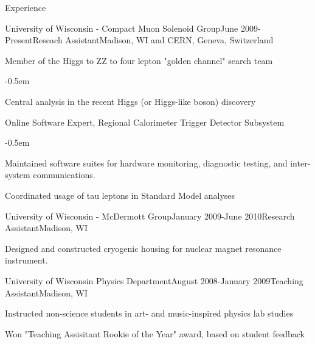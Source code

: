 \documentclass{resume} %
\begin{document}
\begin{rSection}{Experience}
\begin{rSubsection}{University of Wisconsin - Compact Muon Solenoid Group}{June
2009-Present}{Reseach Assistant}{Madison, WI and CERN, Geneva, Switzerland}
\item Member of the Higgs to ZZ to four lepton "golden channel" search team
    \begin{list}{}{\leftmargin=1.5em} 
      \itemsep -0.5em \vspace{-0.5em} %
      \item Central analysis in the recent Higgs (or Higgs-like boson)
          discovery
    \end{list}

\item Online Software Expert, Regional Calorimeter Trigger Detector Subsystem
    \begin{list}{}{\leftmargin=1.5em} %
      \itemsep -0.5em \vspace{-0.5em} %
      \item Maintained software suites for hardware monitoring,
          diagnostic testing, and inter-system communications.
    \end{list}
\item Coordinated usage of tau leptons in Standard Model analyses

\end{rSubsection}

\begin{rSubsection}{University of Wisconsin - McDermott Group}{January 2009-June 2010}{Research Assistant}{Madison, WI}
\item Designed and constructed cryogenic housing for nuclear magnet
    resonance instrument.

\end{rSubsection}

\begin{rSubsection}{University of Wisconsin Physics Department}{August
2008-January 2009}{Teaching Assistant}{Madison, WI}
\item Instructed non-science students in art- and music-inspired physics
    lab studies
\item Won "Teaching Assisitant Rookie of the Year" award, based on
    student feedback
\end{rSubsection}

\end{rSection}

\end{document}
